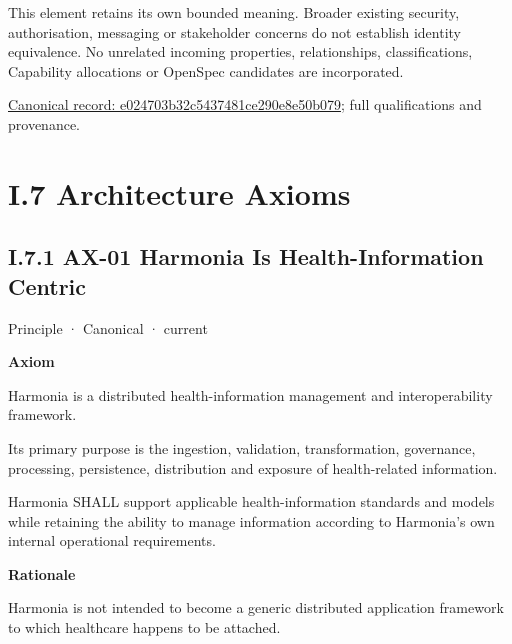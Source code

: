 This element retains its own bounded meaning. Broader existing security,
authorisation, messaging or stakeholder concerns do not establish identity
equivalence. No unrelated incoming properties, relationships, classifications,
Capability allocations or OpenSpec candidates are incorporated.


{\footnotesize \href{../../../../continuum/motivation/constraint/mandate/e024703b32c5437481ce290e8e50b079.md}{Canonical record: e024703b32c5437481ce290e8e50b079}; full qualifications and provenance.}\par
\chapter*{I.7 Architecture Axioms}
\label{navigation:I.7}

\section*{I.7.1 AX-01 Harmonia Is Health-Information Centric}
\label{navigation:I.7.1}

\label{element:e9bd61acaaea4577bc4086a5639e52c3}
{\small Principle · Canonical · current}\par

\par\medskip\textbf{Axiom}\par


Harmonia is a distributed health-information management and
interoperability framework.



Its primary purpose is the ingestion, validation, transformation,
governance, processing, persistence, distribution and exposure of
health-related information.



Harmonia SHALL support applicable health-information standards and
models while retaining the ability to manage information according to
Harmonia's own internal operational requirements.



\par\medskip\textbf{Rationale}\par


Harmonia is not intended to become a generic distributed application
framework to which healthcare happens to be attached.



